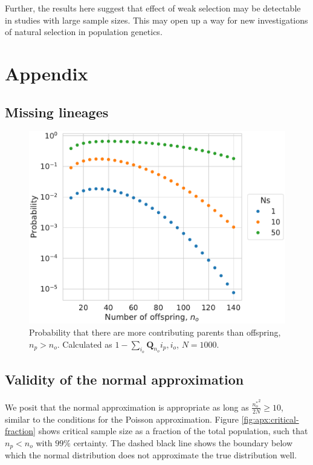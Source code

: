 \documentclass[review]{elsarticle}
\begin{document}
Further, the results here suggest that effect of weak selection may be detectable in studies with
large sample sizes. This may open up a way for new investigations of natural selection in population
genetics.



\section{Appendix}
\renewcommand{\thefigure}{S\arabic{figure}}
\setcounter{figure}{0}

\subsection{Missing lineages}

\begin{figure}
  \centering
  \includegraphics[width=\textwidth]{fig/missing.pdf}
  \caption{Probability that there are more contributing parents than offspring, $n_p > n_o$.
    Calculated as $1-\sum_{i_o} \mathbf{Q}_{n_o}{i_p, i_o}$, $N=1000$.}
  \label{fig:apx:missing}
\end{figure}

\subsection{Validity of the normal approximation}

We posit that the normal approximation is appropriate as long as $\frac{{n_o^*}^2}{2N} \ge 10$,
similar to the conditions for the Poisson approximation. Figure \ref{fig:apx:critical-fraction}
shows critical sample size as a fraction of the total population, such that $n_p < n_o$ with $99\%$
certainty. The dashed black line shows the boundary below which the normal distribution does not
approximate the true distribution well.
\end{document}

